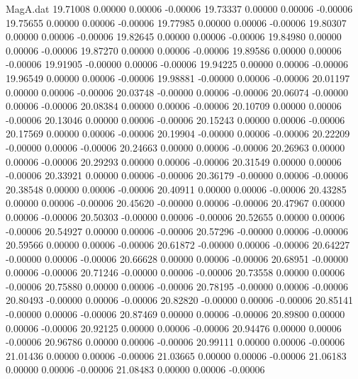 \begin{filecontents}{MagA.dat}
  19.71008    0.00000    0.00006   -0.00006
  19.73337    0.00000    0.00006   -0.00006
  19.75655    0.00000    0.00006   -0.00006
  19.77985    0.00000    0.00006   -0.00006
  19.80307    0.00000    0.00006   -0.00006
  19.82645    0.00000    0.00006   -0.00006
  19.84980    0.00000    0.00006   -0.00006
  19.87270    0.00000    0.00006   -0.00006
  19.89586    0.00000    0.00006   -0.00006
  19.91905   -0.00000    0.00006   -0.00006
  19.94225    0.00000    0.00006   -0.00006
  19.96549    0.00000    0.00006   -0.00006
  19.98881   -0.00000    0.00006   -0.00006
  20.01197    0.00000    0.00006   -0.00006
  20.03748   -0.00000    0.00006   -0.00006
  20.06074   -0.00000    0.00006   -0.00006
  20.08384    0.00000    0.00006   -0.00006
  20.10709    0.00000    0.00006   -0.00006
  20.13046    0.00000    0.00006   -0.00006
  20.15243    0.00000    0.00006   -0.00006
  20.17569    0.00000    0.00006   -0.00006
  20.19904   -0.00000    0.00006   -0.00006
  20.22209   -0.00000    0.00006   -0.00006
  20.24663    0.00000    0.00006   -0.00006
  20.26963    0.00000    0.00006   -0.00006
  20.29293    0.00000    0.00006   -0.00006
  20.31549    0.00000    0.00006   -0.00006
  20.33921    0.00000    0.00006   -0.00006
  20.36179   -0.00000    0.00006   -0.00006
  20.38548    0.00000    0.00006   -0.00006
  20.40911    0.00000    0.00006   -0.00006
  20.43285    0.00000    0.00006   -0.00006
  20.45620   -0.00000    0.00006   -0.00006
  20.47967    0.00000    0.00006   -0.00006
  20.50303   -0.00000    0.00006   -0.00006
  20.52655    0.00000    0.00006   -0.00006
  20.54927    0.00000    0.00006   -0.00006
  20.57296   -0.00000    0.00006   -0.00006
  20.59566    0.00000    0.00006   -0.00006
  20.61872   -0.00000    0.00006   -0.00006
  20.64227   -0.00000    0.00006   -0.00006
  20.66628    0.00000    0.00006   -0.00006
  20.68951   -0.00000    0.00006   -0.00006
  20.71246   -0.00000    0.00006   -0.00006
  20.73558    0.00000    0.00006   -0.00006
  20.75880    0.00000    0.00006   -0.00006
  20.78195   -0.00000    0.00006   -0.00006
  20.80493   -0.00000    0.00006   -0.00006
  20.82820   -0.00000    0.00006   -0.00006
  20.85141   -0.00000    0.00006   -0.00006
  20.87469    0.00000    0.00006   -0.00006
  20.89800    0.00000    0.00006   -0.00006
  20.92125    0.00000    0.00006   -0.00006
  20.94476    0.00000    0.00006   -0.00006
  20.96786    0.00000    0.00006   -0.00006
  20.99111    0.00000    0.00006   -0.00006
  21.01436    0.00000    0.00006   -0.00006
  21.03665    0.00000    0.00006   -0.00006
  21.06183    0.00000    0.00006   -0.00006
  21.08483    0.00000    0.00006   -0.00006

\end{filecontents}
